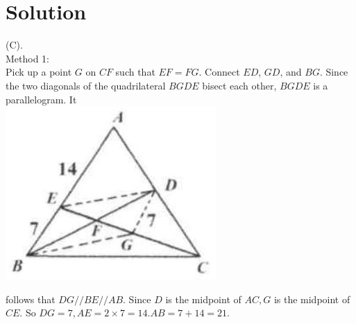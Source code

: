 \documentclass{article}
\begin{document}
\section*{Solution}
(C).\\
Method 1:\\
Pick up a point \(G\) on \(C F\) such that \(E F=F G\). Connect \(E D\), \(G D\), and \(B G\). Since the two diagonals of the quadrilateral \(B G D E\) bisect each other, \(B G D E\) is a parallelogram. It\\
\centering
\includegraphics[width=\textwidth]{images/132(2).jpg}


follows that \(D G / / B E / / A B\). Since \(D\) is the midpoint of \(A C, G\) is the midpoint of \(C E\). So \(D G=7, A E=2 \times 7=14 . A B=7+14=21\).
\end{document}
